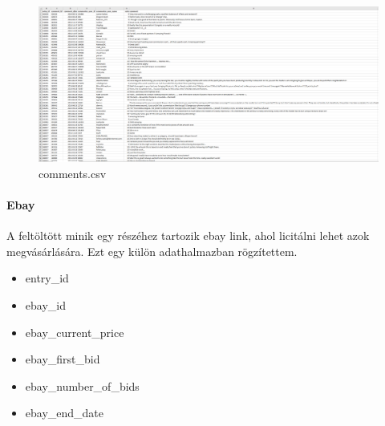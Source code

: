 \documentclass[14pt,a4paper]{article}
\begin{document}
\begin{figure}[H]
\centering
\includegraphics[width=1.0\columnwidth]{pics/csv_comments.png}
\caption{comments.csv}
\end{figure}

\paragraph{Ebay}

A feltöltött minik egy részéhez tartozik ebay link, ahol licitálni lehet azok megvásárlására. Ezt egy külön
adathalmazban rögzítettem.

\begin{itemize}
\item entry\_id
\item ebay\_id
\item ebay\_current\_price
\item ebay\_first\_bid
\item ebay\_number\_of\_bids
\item ebay\_end\_date
\end{itemize}
\end{document}
